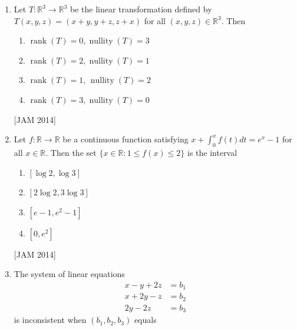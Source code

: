 \begin{enumerate}
\begin{enumerate}
 
\item $\left\{(x, y, z) \in \mathbb{R}^{3}: x+2 y=0,2 x+3 z=0\right\}$ 
\item $\left\{(x, y, z) \in \mathbb{R}^{3}: 2 x+3 y+4 z-3=0, z=0\right\}$ 
\item $\left\{(x, y, z) \in \mathbb{R}^{3}: x \geq 0, y \geq 0\right\}$ 
\item $\left\{(x, y, z) \in \mathbb{R}^{3}: x-1=0, y=0\right\}$

\end{enumerate}
\hfill [JAM 2014]



\item  Let $T: \mathbb{R}^{3} \rightarrow \mathbb{R}^{3}$ be the linear transformation defined by $T(x, y, z)=(x+y, y+z, z+x)$ for all $(x, y, z) \in \mathbb{R}^{3}$. Then 

\begin{enumerate}
 
\item $\operatorname{rank}(T)=0, \operatorname{nullity}(T)=3$ 
\item $\operatorname{rank}(T)=2, \operatorname{nullity}(T)=1$ 
\item $\operatorname{rank}(T)=1$, $\operatorname{nullity}(T)=2$ 
\item $\operatorname{rank}(T)=3, \operatorname{nullity}(T)=0$

\end{enumerate}
\hfill [JAM 2014]



\item  Let $f: \mathbb{R} \rightarrow \mathbb{R}$ be a continuous function satisfying $x+\int_{0}^{x} f(t) d t=e^{x}-1$ for all $x \in \mathbb{R}$. Then the set $\{x \in \mathbb{R}: 1 \leq f(x) \leq 2\}$ is the interval 

\begin{enumerate}
 \item $[\log 2, \log 3]$ 
\item $[2 \log 2,3 \log 3]$ 
\item $\left[e-1, e^{2}-1\right]$ 
\item $\left[0, e^{2}\right]$
\end{enumerate}
\hfill [JAM 2014]



 \item  The system of linear equations
$$
\begin{aligned}
x-y+2 z &=b_{1} \\
x+2 y-z &=b_{2} \\
2 y-2 z &=b_{3}
\end{aligned}
$$
is inconsistent when $\left(b_{1}, b_{2}, b_{3}\right)$ equals 


\end{enumerate}
